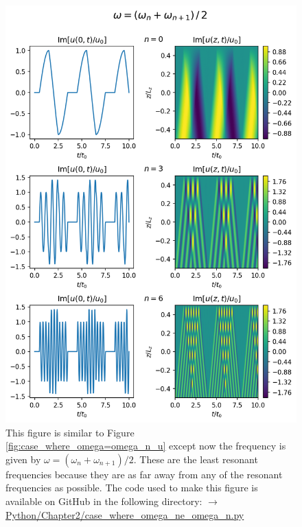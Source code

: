 \begin{figure}
    \centering
    \vspace{-30pt}
    \includegraphics[width=\textwidth,height=0.95\textheight,keepaspectratio]{figures/chapter02/case_where_omega_ne_omega_n_u.png}
    \vspace{-10pt}
    \caption{This figure is similar to Figure \ref{fig:case_where_omega=omega_n_u} except now the frequency is given by $\omega=(\omega_n+\omega_{n+1})/2$. These are the least resonant frequencies because they are as far away from any of the resonant frequencies as possible. The code used to make this figure is available on GitHub in the following directory:\newline
    \href{https://github.com/aleksyprok/apkp_thesis/blob/main/Python/Chapter2/case_where_omega_ne_omega_n.py}{$\rightarrow$ Python/Chapter2/case\_where\_omega\_ne\_omega\_n.py}}
    \vspace{-30pt}
    \label{fig:case_where_omega_ne_omega_n_u}
\end{figure}

